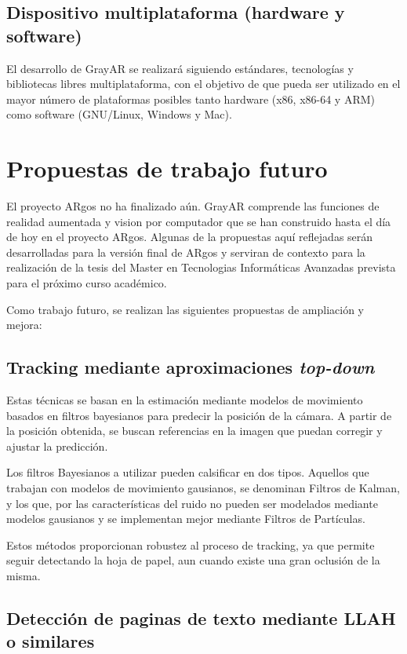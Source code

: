 \subsection{Dispositivo multiplataforma (hardware y software)}
El desarrollo de GrayAR se realizará siguiendo estándares, tecnologías y bibliotecas libres multiplataforma, con el objetivo de que pueda ser utilizado en el mayor número de plataformas posibles tanto hardware (x86, x86-64 y ARM) como software (GNU/Linux, Windows y Mac).

\section{Propuestas de trabajo futuro}
El proyecto ARgos no ha finalizado aún. GrayAR comprende las funciones de realidad aumentada y vision por computador que se han construido hasta el día de hoy en el proyecto ARgos. Algunas de la propuestas aquí reflejadas serán desarrolladas para la versión final de ARgos y serviran de contexto para la realización de la tesis del Master en Tecnologias Informáticas Avanzadas prevista para el próximo curso académico.

Como trabajo futuro, se realizan las siguientes propuestas de ampliación y mejora:

\subsection{Tracking mediante aproximaciones \emph{top-down}} 

Estas técnicas se basan en la estimación mediante modelos de movimiento basados en filtros bayesianos para predecir la posición de la cámara. A partir de la posición obtenida, se buscan referencias en la imagen que puedan corregir y ajustar la predicción.
  
  Los filtros Bayesianos a utilizar pueden calsificar en dos tipos. Aquellos que trabajan con modelos de movimiento gausianos, se denominan Filtros de Kalman, y los que, por las características del ruido no pueden ser modelados mediante modelos gausianos y se implementan mejor mediante Filtros de Partículas.
  
  Estos métodos proporcionan robustez al proceso de tracking, ya que permite seguir detectando la hoja de papel, aun cuando existe una gran oclusión de la misma. 

\subsection{Detección de paginas de texto mediante LLAH o similares}
  
